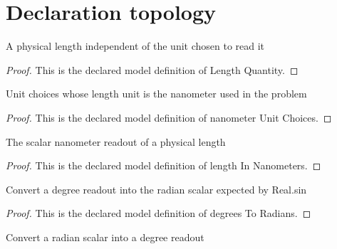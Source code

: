 \section{Declaration topology}
\begin{definition}
  \label{def:physics:phyx-mini-0079:phyxminiproblems-problemphyxmini0079-lengthquantity}
  A physical length independent of the unit chosen to read it
\end{definition}
\begin{proof}
  This is the declared model definition of Length Quantity.
\end{proof}
\begin{definition}
  \label{def:physics:phyx-mini-0079:phyxminiproblems-problemphyxmini0079-nanometerunitchoices}
  Unit choices whose length unit is the nanometer used in the problem
\end{definition}
\begin{proof}
  This is the declared model definition of nanometer Unit Choices.
\end{proof}
\begin{definition}
  \label{def:physics:phyx-mini-0079:phyxminiproblems-problemphyxmini0079-lengthinnanometers}
  The scalar nanometer readout of a physical length
\end{definition}
\begin{proof}
  This is the declared model definition of length In Nanometers.
\end{proof}
\begin{definition}
  \label{def:physics:phyx-mini-0079:phyxminiproblems-problemphyxmini0079-degreestoradians}
  Convert a degree readout into the radian scalar expected by Real.sin
\end{definition}
\begin{proof}
  This is the declared model definition of degrees To Radians.
\end{proof}
\begin{definition}
  \label{def:physics:phyx-mini-0079:phyxminiproblems-problemphyxmini0079-radianstodegrees}
  Convert a radian scalar into a degree readout
\end{definition}
